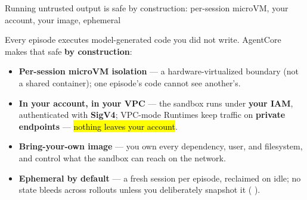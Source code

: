 \begin{frame}{Running untrusted output is safe by construction: per-session microVM, your account, your image, ephemeral}
{\footnotesize Every episode executes model-generated code you did not write. AgentCore makes that safe \textbf{by construction}:\par}
\vspace{2mm}
\begin{itemize}\small\setlength{\itemsep}{2mm}
\item \textbf{Per-session microVM isolation} --- a hardware-virtualized boundary (not a shared container); one episode's code cannot see another's.
\item \textbf{In your account, in your VPC} --- the sandbox runs under \textbf{your IAM}, authenticated with \textbf{SigV4}; VPC-mode Runtimes keep traffic on \textbf{private endpoints} --- \hl{nothing leaves your account}.
\item \textbf{Bring-your-own image} --- you own every dependency, user, and filesystem, and control what the sandbox can reach on the network.
\item \textbf{Ephemeral by default} --- a fresh session per episode, reclaimed on idle; no state bleeds across rollouts unless you deliberately snapshot it ( ).
\end{itemize}
\vspace{2mm}
\end{frame}

